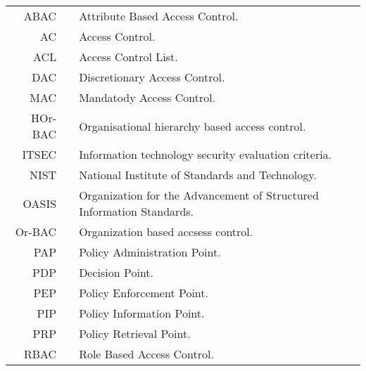 \begin{center}
	\begin{tabular}[t]{rp{5mm}p{12cm}}
		ABAC && Attribute Based Access Control.\\
        AC && Access Control.\\
        ACL && Access Control List.\\
        DAC && Discretionary Access Control.\\
        MAC && Mandatody Access Control.\\
        HOr-BAC && Organisational hierarchy based access control. \\
        ITSEC && Information technology security evaluation criteria.\\
		NIST && National Institute of Standards and Technology.\\
		OASIS && Organization for the Advancement of Structured Information Standards.\\
		Or-BAC && Organization based accsess control. \\
		PAP && Policy Administration Point.\\
		PDP &&  Decision Point.\\
		PEP && Policy Enforcement Point.\\
	    PIP && Policy Information Point.\\
		PRP && Policy Retrieval Point.\\
		RBAC && Role Based Access Control.\\
	\end{tabular}
\end{center}
